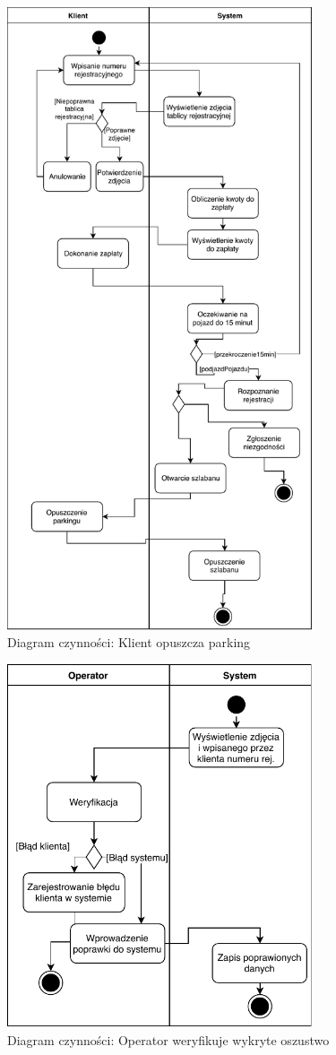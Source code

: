 \begin{figure}[H]
	\centering
	\includegraphics[width=90mm]{diagramy/DiagCzynWyjazd.pdf}
	\caption{Diagram czynności: Klient opuszcza parking}
\end{figure}


\begin{figure}[H]
	\centering
	\includegraphics[width=90mm]{diagramy/DiagCzynWyswietlZdjecia.pdf}
	\caption{Diagram czynności: Operator weryfikuje wykryte oszustwo}
\end{figure}

